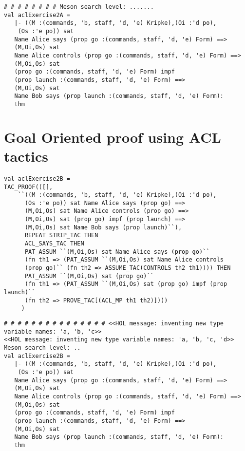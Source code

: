 \documentclass{report}
\begin{document}
\begin{session}
  \begin{scriptsize}
\begin{verbatim}
# # # # # # # # Meson search level: .......
val aclExercise2A =
   |- ((M :(commands, 'b, staff, 'd, 'e) Kripke),(Oi :'d po),
    (Os :'e po)) sat
   Name Alice says (prop go :(commands, staff, 'd, 'e) Form) ==>
   (M,Oi,Os) sat
   Name Alice controls (prop go :(commands, staff, 'd, 'e) Form) ==>
   (M,Oi,Os) sat
   (prop go :(commands, staff, 'd, 'e) Form) impf
   (prop launch :(commands, staff, 'd, 'e) Form) ==>
   (M,Oi,Os) sat
   Name Bob says (prop launch :(commands, staff, 'd, 'e) Form):
   thm
\end{verbatim}
  \end{scriptsize}
\end{session}

\section{Goal Oriented proof using ACL tactics}
\label{goal-13-10-2-C}
\begin{lstlisting}[frame=TBlr]
val aclExercise2B =
TAC_PROOF(([],
	``((M :(commands, 'b, staff, 'd, 'e) Kripke),(Oi :'d po),
	  (Os :'e po)) sat Name Alice says (prop go) ==>
  	  (M,Oi,Os) sat Name Alice controls (prop go) ==>
  	  (M,Oi,Os) sat (prop go) impf (prop launch) ==>
  	  (M,Oi,Os) sat Name Bob says (prop launch)``),
	  REPEAT STRIP_TAC THEN
	  ACL_SAYS_TAC THEN
	  PAT_ASSUM ``(M,Oi,Os) sat Name Alice says (prop go)``
	  (fn th1 => (PAT_ASSUM ``(M,Oi,Os) sat Name Alice controls
	  (prop go)`` (fn th2 => ASSUME_TAC(CONTROLS th2 th1)))) THEN
	  PAT_ASSUM ``(M,Oi,Os) sat (prop go)``
	  (fn th1 => (PAT_ASSUM ``(M,Oi,Os) sat (prop go) impf (prop launch)``
	  (fn th2 => PROVE_TAC[(ACL_MP th1 th2)])))
	 )
\end{lstlisting}

\begin{session}
  \begin{scriptsize}
\begin{verbatim}
# # # # # # # # # # # # # # # <<HOL message: inventing new type variable names: 'a, 'b, 'c>>
<<HOL message: inventing new type variable names: 'a, 'b, 'c, 'd>>
Meson search level: ..
val aclExercise2B =
   |- ((M :(commands, 'b, staff, 'd, 'e) Kripke),(Oi :'d po),
    (Os :'e po)) sat
   Name Alice says (prop go :(commands, staff, 'd, 'e) Form) ==>
   (M,Oi,Os) sat
   Name Alice controls (prop go :(commands, staff, 'd, 'e) Form) ==>
   (M,Oi,Os) sat
   (prop go :(commands, staff, 'd, 'e) Form) impf
   (prop launch :(commands, staff, 'd, 'e) Form) ==>
   (M,Oi,Os) sat
   Name Bob says (prop launch :(commands, staff, 'd, 'e) Form):
   thm
\end{verbatim}
  \end{scriptsize}
\end{session}
\end{document}
